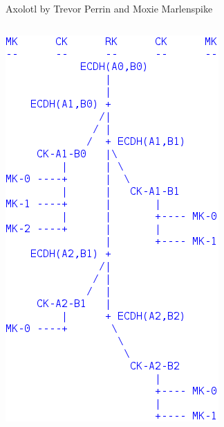 \documentclass[fleqn,xcolor={usenames,dvipsnames}]{beamer}
\begin{document}
\begin{frame}{Axolotl by Trevor Perrin and Moxie Marlenspike}
\begin{columns}[T]
\includegraphics[width=\textwidth]{../pics/axolotl_diagram}
\end{columns}
\end{frame}


\end{document}

